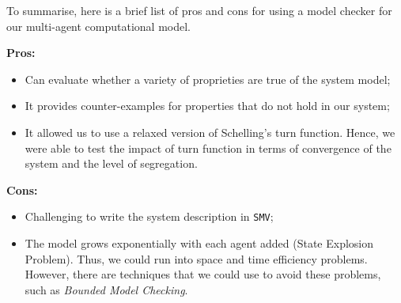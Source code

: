 \documentclass[../main.tex]{subfiles}
\begin{document}
To summarise, here is a brief list of pros and cons for using a model checker for our multi-agent computational model.

\textbf{Pros:}
\begin{itemize}
    \item Can evaluate whether a variety of proprieties are true of the system model;
    \item It provides counter-examples for properties that do not hold in our system;
    \item It allowed us to use a relaxed version of Schelling's turn function. Hence, we were able to test the impact of turn function in terms of convergence of the system and the level of segregation.
\end{itemize}

\textbf{Cons:}
\begin{itemize}
    \item Challenging to write the system description in \verb|SMV|;
    \item The model grows exponentially with each agent added (State Explosion Problem). Thus, we could run into space and time efficiency problems. However, there are techniques that we could use to avoid these problems, such as \textit{Bounded Model Checking}.
\end{itemize}
\end{document}
